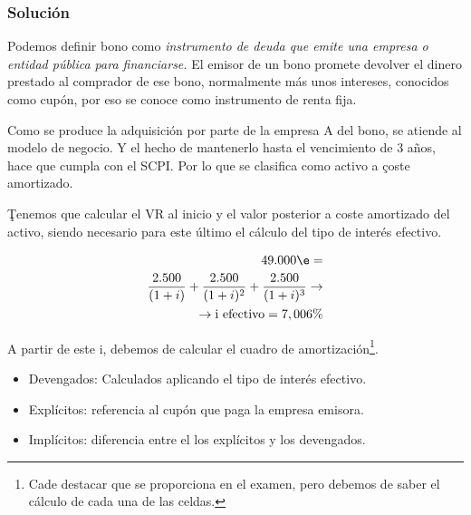 \subsubsection*{Solución}

Podemos definir bono como \textit{instrumento de deuda que emite una empresa o entidad pública para financiarse.} El emisor de un bono promete devolver el dinero prestado al comprador de ese bono, normalmente más unos intereses, conocidos como cupón, por eso se conoce como instrumento de renta fija.

Como se produce la adquisición por parte de la empresa A del bono, se atiende al modelo de negocio. Y el hecho de mantenerlo hasta el vencimiento de 3 años, hace que cumpla con el SCPI. Por lo que se clasifica como activo a \c{coste amortizado}.


\c{Tenemos que calcular el VR al inicio y el valor posterior a coste amortizado del activo, siendo necesario para este último el cálculo del tipo de interés efectivo.}

\begin{align*}
    \text{49.000} \e = \\ 
    \frac{\text{2.500}}{(1+i)} + \frac{\text{2.500}}{(1+i)^2} + \frac{\text{2.500}}{(1+i)^3} \rightarrow \\
    \rightarrow \text{i efectivo} = 7,006\%
\end{align*}

A partir de este i, debemos de calcular el cuadro de amortización\footnote{Cade destacar que se proporciona en el examen, pero debemos de saber el cálculo de cada una de las celdas.}.

\begin{tcolorbox}[colback=yellow!5!white,colframe=yellow!75!black, title=Cálculo de intereses]
    \begin{itemize}
        \item Devengados: Calculados aplicando el tipo de interés efectivo.
        \item Explícitos: referencia al cupón que paga la empresa emisora.
        \item Implícitos: diferencia entre el los explícitos y los devengados.
    \end{itemize}
\end{tcolorbox}

